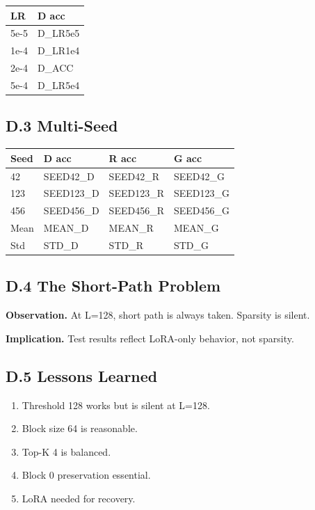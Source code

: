 \begin{table}[H]
\centering
\small
\begin{tabular}{ll}
\toprule
\textbf{LR} & \textbf{D acc} \\
\midrule
5e-5 & {{D\_LR5e5}} \\
1e-4 & {{D\_LR1e4}} \\
2e-4 & {{D\_ACC}} \\
5e-4 & {{D\_LR5e4}} \\
\bottomrule
\end{tabular}
\end{table}

\subsection{D.3 Multi-Seed}

\begin{table}[H]
\centering
\small
\begin{tabular}{llll}
\toprule
\textbf{Seed} & \textbf{D acc} & \textbf{R acc} & \textbf{G acc} \\
\midrule
42 & {{SEED42\_D}} & {{SEED42\_R}} & {{SEED42\_G}} \\
123 & {{SEED123\_D}} & {{SEED123\_R}} & {{SEED123\_G}} \\
456 & {{SEED456\_D}} & {{SEED456\_R}} & {{SEED456\_G}} \\
Mean & {{MEAN\_D}} & {{MEAN\_R}} & {{MEAN\_G}} \\
Std & {{STD\_D}} & {{STD\_R}} & {{STD\_G}} \\
\bottomrule
\end{tabular}
\end{table}

\subsection{D.4 The Short-Path Problem}

\textbf{Observation.} At L=128, short path is always taken. Sparsity is silent.

\textbf{Implication.} Test results reflect LoRA-only behavior, not sparsity.

\subsection{D.5 Lessons Learned}

\begin{enumerate}
\item Threshold 128 works but is silent at L=128.
\item Block size 64 is reasonable.
\item Top-K 4 is balanced.
\item Block 0 preservation essential.
\item LoRA needed for recovery.

\end{enumerate}
